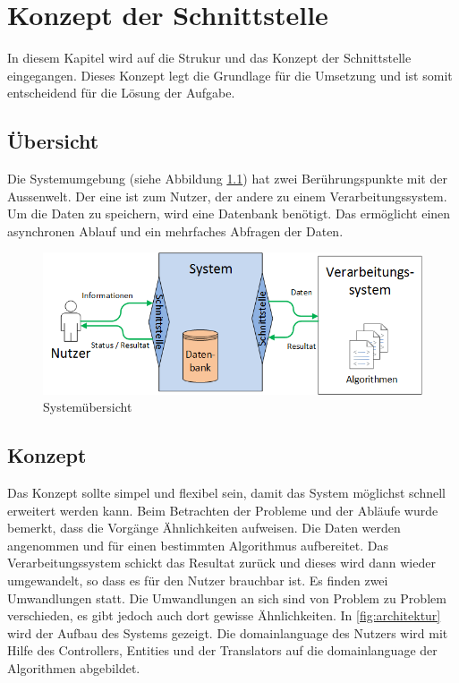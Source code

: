 %
%

\chapter{Konzept der Schnittstelle \resultAssignment{[R4]}}\label{chap.architektur}
In diesem Kapitel wird auf die Strukur und das Konzept der Schnittstelle eingegangen. Dieses Konzept legt die Grundlage für die Umsetzung und ist somit entscheidend für die Lösung der 
Aufgabe.

\section{Übersicht}\label{architektur_uebersicht}
Die Systemumgebung (siehe Abbildung \ref{fig:system_scope}) hat zwei Berührungspunkte mit der Aussenwelt. Der eine ist zum Nutzer, der andere zu einem Verarbeitungssystem. 
Um die Daten zu speichern, wird eine Datenbank benötigt. Das ermöglicht einen asynchronen Ablauf und ein mehrfaches Abfragen der Daten.
\begin{figure}[h]
\centering
\includegraphics[scale=0.8]{images/visio/Systemscope.png}
\caption[Systemübersicht]{Systemübersicht \selfmade{}}
\label{fig:system_scope}
\end{figure}

\section{Konzept}\label{arch_backend}
Das Konzept sollte simpel und flexibel sein, damit das System möglichst schnell erweitert werden kann. Beim Betrachten der Probleme und der Abläufe wurde bemerkt, dass die Vorgänge 
Ähnlichkeiten aufweisen. Die Daten werden angenommen und für einen bestimmten Algorithmus aufbereitet. Das Verarbeitungssystem schickt das Resultat zurück und dieses wird dann 
wieder umgewandelt, so dass es für den Nutzer brauchbar ist. Es finden zwei Umwandlungen statt. Die Umwandlungen an sich sind von Problem zu Problem verschieden, es gibt jedoch 
auch dort gewisse Ähnlichkeiten. In \autoref{fig:architektur} wird der Aufbau des Systems gezeigt. Die  \gls{domainlanguage} des Nutzers wird mit Hilfe des Controllers, Entities und 
der Translators auf die \gls{domainlanguage} der Algorithmen abgebildet.

